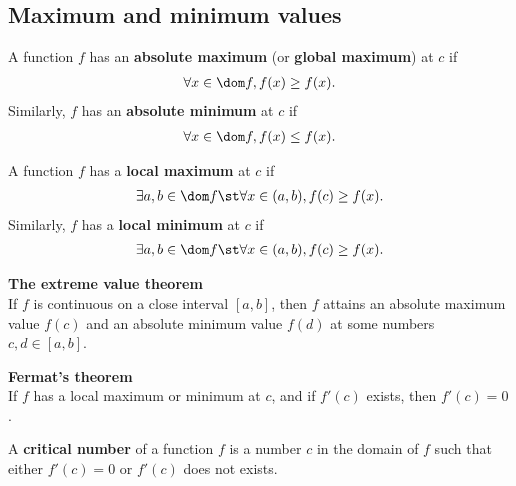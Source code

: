 \documentclass{article}
\begin{document}
\subsection{Maximum and minimum values}
\begin{definition}
	A function $f$ has an \textbf{absolute maximum} (or \textbf{global maximum}) at $c$ if
	\begin{align*}
		\forall x\in \dom f, f(x)\geq f(x).
	\end{align*}
	Similarly, $f$ has an \textbf{absolute minimum} at $c$ if
	\begin{align*}
		\forall x\in \dom f, f(x)\leq f(x).
	\end{align*}
\end{definition}
\begin{definition}
	A function $f$ has a \textbf{local maximum} at $c$ if
	\begin{align*}
		\exists a,b\in \dom f \st \forall x\in (a,b), f(c)\geq f(x).
	\end{align*}
	Similarly, $f$ has a \textbf{local minimum} at $c$ if
	\begin{align*}
		\exists a,b\in \dom f\st \forall x\in(a,b), f(c)\geq f(x).
	\end{align*}
\end{definition}
\begin{theorem}
	\textbf{The extreme value theorem}\\
	If $f$ is continuous on a close interval $[a,b]$, then $f$ attains an absolute maximum value $f(c)$ and an absolute minimum value $f(d)$ at some numbers $c,d\in[a,b]$.
\end{theorem}
\begin{theorem}
	\textbf{Fermat's theorem}\\
	If $f$ has a local maximum or minimum at $c$, and if $f'(c)$ exists, then $f'(c)=0$.
\end{theorem}
\begin{definition}
	A \textbf{critical number} of a function $f$ is a number $c$ in the domain of $f$ such that either $f'(c)=0$ or $f'(c)$ does not exists.
\end{definition}
\end{document}
